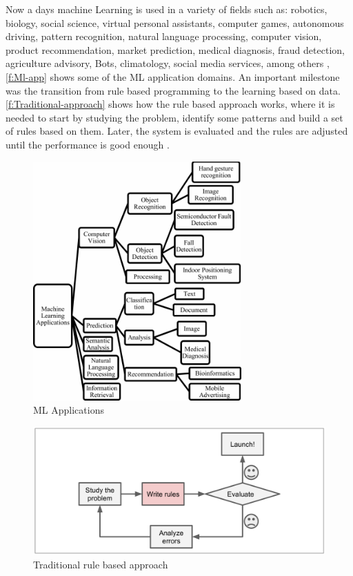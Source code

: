 Now a days machine Learning is used in a variety of fields such as: robotics, biology, social science, virtual personal assistants, computer games, autonomous driving, pattern recognition, natural language processing, computer vision, product recommendation, market prediction, medical diagnosis, fraud detection, agriculture advisory, Bots, climatology, social media services, among others \cite{Srivastava_2019, Shinde_2018, Ray2019}, \autoref{f:Ml-app} shows some of the \ac{ML} application domains. An important milestone was the transition from rule based programming to the learning based on data. \autoref{f:Traditional-approach} shows how the rule based approach works, where it is needed to start by studying the problem, identify some patterns and build a set of rules based on them. Later, the system is evaluated and the rules are adjusted until the performance is good enough \cite{geron2017}.

\begin{figure}[t]
\centering
\includegraphics[width=8cm]{figures/Ch2/ML-Applications.png}
\caption{ML Applications\cite{Shinde_2018}}
\label{f:Ml-app}
\end{figure}

\begin{figure}[h]
\centering
\includegraphics[width=\linewidth]{figures/Ch2/Tradicional-Approach.png}
\caption{Traditional rule based approach \cite{geron2017}}
\label{f:Traditional-approach}
\end{figure}

